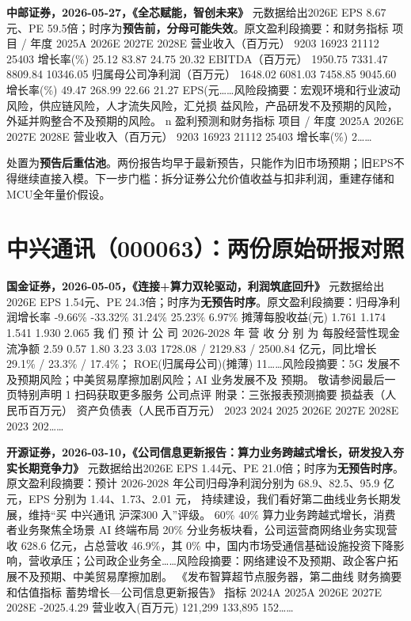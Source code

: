 \textbf{中邮证券，2026-05-27，《全芯赋能，智创未来》}
元数据给出2026E EPS 8.67元、PE 59.5倍；时序为\textbf{预告前，分母可能失效}。原文盈利段摘要：和财务指标 项目 / 年度 2025A 2026E 2027E 2028E 营业收入（百万元） 9203 16923 21112 25403 增长率(\%) 25.12 83.87 24.75 20.32 EBITDA（百万元） 1950.75 7331.47 8809.84 10346.05 归属母公司净利润（百万元） 1648.02 6081.03 7458.85 9045.60 增长率(\%) 49.47 268.99 22.66 21.27 EPS(元……风险段摘要：宏观环境和行业波动风险，供应链风险，人才流失风险，汇兑损 益风险，产品研发不及预期的风险，外延并购整合不及预期的风险。 n 盈利预测和财务指标 项目 / 年度 2025A 2026E 2027E 2028E 营业收入（百万元） 9203 16923 21112 25403 增长率(\%) 2……

\begin{keyinsight}[AStock处理]
处置为\textbf{预告后重估池}。两份报告均早于最新预告，只能作为旧市场预期；旧EPS不得继续直接入模。下一步门槛：拆分证券公允价值收益与扣非利润，重建存储和MCU全年量价假设。
\end{keyinsight}

\section{中兴通讯（000063）：两份原始研报对照}

\textbf{国金证券，2026-05-05，《连接+算力双轮驱动，利润筑底回升》}
元数据给出2026E EPS 1.54元、PE 24.3倍；时序为\textbf{无预告时序}。原文盈利段摘要：归母净利润增长率 -9.66\% -33.32\% 31.24\% 25.23\% 6.97\% 摊薄每股收益(元) 1.761 1.174 1.541 1.930 2.065 我 们 预 计 公 司 2026-2028 年 营 收 分 别 为 每股经营性现金流净额 2.59 0.57 1.80 3.23 3.03 1728.08 / 2129.83 / 2500.84 亿元，同比增长 29.1\% / 23.3\% / 17.4\%； ROE(归属母公司)(摊薄) 11……风险段摘要：5G 发展不及预期风险；中美贸易摩擦加剧风险；AI 业务发展不及 预期。 敬请参阅最后一页特别声明 1 扫码获取更多服务 公司点评 附录：三张报表预测摘要 损益表（人民币百万元） 资产负债表（人民币百万元） 2023 2024 2025 2026E 2027E 2028E 2023 202……

\textbf{开源证券，2026-03-10，《公司信息更新报告：算力业务跨越式增长，研发投入夯实长期竞争力》}
元数据给出2026E EPS 1.44元、PE 21.0倍；时序为\textbf{无预告时序}。原文盈利段摘要：预计 2026-2028 年公司归母净利润分别为 68.9、82.5、95.9 亿元，EPS 分别为 1.44、1.73、2.01 元， 持续建设，我们看好第二曲线业务长期发展，维持“买 中兴通讯 沪深300 入”评级。 60\% 40\% 算力业务跨越式增长，消费者业务聚焦全场景 AI 终端布局 20\% 分业务板块看，公司运营商网络业务实现营收 628.6 亿元，占总营收 46.9\%，其 0\% 中，国内市场受通信基础设施投资下降影响，营收承压；公司政企业务全……风险段摘要：网络建设不及预期、政企客户拓展不及预期、中美贸易摩擦加剧。 《发布智算超节点服务器，第二曲线 财务摘要和估值指标 蓄势增长—公司信息更新报告》 指标 2024A 2025A 2026E 2027E 2028E -2025.4.29 营业收入(百万元) 121,299 133,895 152……

